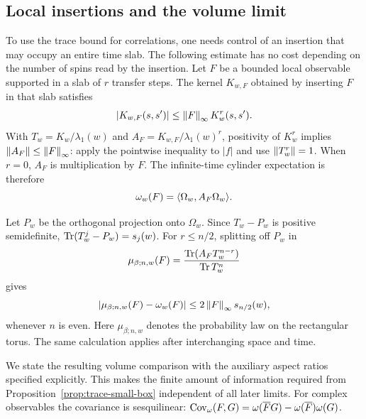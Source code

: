 \subsection{Local insertions and the volume limit}

To use the trace bound for correlations, one needs control of an
insertion that may occupy an entire time slab.  The following estimate
has no cost depending on the number of spins read by the insertion.
Let $F$ be a bounded local observable supported in a slab of $r$
transfer steps.  The kernel $K_{w,F}$ obtained by inserting $F$ in that
slab satisfies
\[
 |K_{w,F}(s,s')|\le\left\lVert F\right\rVert_\infty K_w^r(s,s').
\]
With $T_w=K_w/\lambda_1(w)$ and
$A_F=K_{w,F}/\lambda_1(w)^r$, positivity of $K_w^r$ implies
$\left\lVert A_F\right\rVert\le\left\lVert F\right\rVert_\infty$: apply the pointwise inequality to
$|f|$ and use $\left\lVert T_w^r\right\rVert=1$.  When $r=0$, $A_F$ is multiplication
by $F$.  The infinite-time cylinder expectation is therefore
\[
 \omega_w(F)=\langle\Omega_w,A_F\Omega_w\rangle.
\]

Let $P_w$ be the orthogonal projection onto $\Omega_w$.  Since
$T_w-P_w$ is positive semidefinite,
$\operatorname{Tr}(T_w^j-P_w)=s_j(w)$.  For $r\le n/2$, splitting off $P_w$ in
\[
 \mu_{\beta;n,w}(F)
    =\frac{\operatorname{Tr}(A_FT_w^{n-r})}{\operatorname{Tr} T_w^n}
\]
gives
\begin{equation}
 |\mu_{\beta;n,w}(F)-\omega_w(F)|
      \le2\left\lVert F\right\rVert_\infty s_{n/2}(w),
 \label{eq:trace-torus-cylinder}
\end{equation}
whenever $n$ is even.  Here $\mu_{\beta;n,w}$ denotes the probability
law on the rectangular torus.  The same calculation applies after
interchanging space and time.

We state the resulting volume comparison with the auxiliary aspect
ratios specified explicitly.  This makes the finite amount of
information required from Proposition~\ref{prop:trace-small-box}
independent of all later limits.  For complex observables the covariance
is sesquilinear:
$\operatorname{Cov}_\omega(F,G)=\omega(\overline F G)
 -\omega(\overline F)\omega(G)$.

